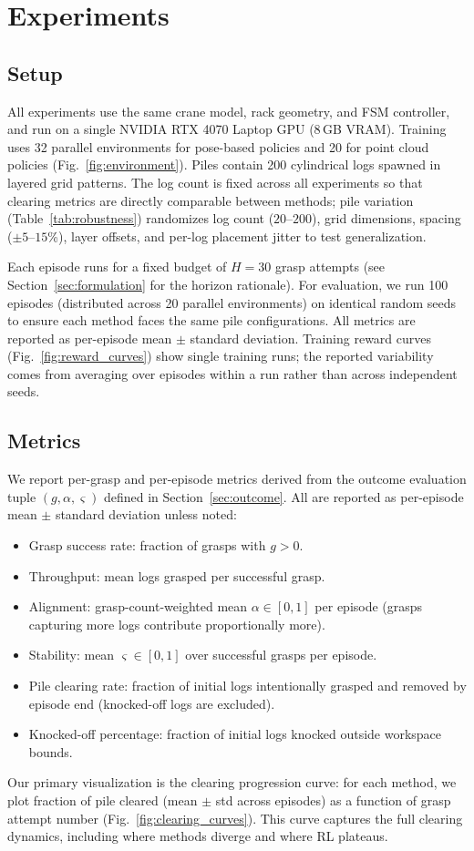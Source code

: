 \documentclass[conference]{IEEEtran}
\begin{document}
\section{Experiments}
\subsection{Setup}
All experiments use the same crane model, rack geometry, and FSM controller, and run on a single NVIDIA RTX 4070 Laptop GPU (8\,GB VRAM).
Training uses 32 parallel environments for pose-based policies and 20 for point cloud policies (Fig.~\ref{fig:environment}).
Piles contain 200 cylindrical logs spawned in layered grid patterns.
The log count is fixed across all experiments so that clearing metrics are directly comparable between methods; pile variation (Table~\ref{tab:robustness}) randomizes log count ($20$--$200$), grid dimensions, spacing ($\pm 5$--$15$\%), layer offsets, and per-log placement jitter to test generalization.

Each episode runs for a fixed budget of $H=30$ grasp attempts (see Section~\ref{sec:formulation} for the horizon rationale).
For evaluation, we run 100 episodes (distributed across 20 parallel environments) on identical random seeds to ensure each method faces the same pile configurations.
All metrics are reported as per-episode mean $\pm$ standard deviation.
Training reward curves (Fig.~\ref{fig:reward_curves}) show single training runs; the reported variability comes from averaging over episodes within a run rather than across independent seeds.

\subsection{Metrics}
\label{sec:metrics}
We report per-grasp and per-episode metrics derived from the outcome evaluation tuple $(g, \alpha, \varsigma)$ defined in Section~\ref{sec:outcome}. All are reported as per-episode mean $\pm$ standard deviation unless noted:
\begin{itemize}
    \item Grasp success rate: fraction of grasps with $g>0$.
    \item Throughput: mean logs grasped per successful grasp.
    \item Alignment: grasp-count-weighted mean $\alpha \in [0,1]$ per episode (grasps capturing more logs contribute proportionally more).
    \item Stability: mean $\varsigma \in [0,1]$ over successful grasps per episode.
    \item Pile clearing rate: fraction of initial logs intentionally grasped and removed by episode end (knocked-off logs are excluded).
    \item Knocked-off percentage: fraction of initial logs knocked outside workspace bounds.
\end{itemize}
Our primary visualization is the clearing progression curve: for each method, we plot fraction of pile cleared (mean $\pm$ std across episodes) as a function of grasp attempt number (Fig.~\ref{fig:clearing_curves}).
This curve captures the full clearing dynamics, including where methods diverge and where RL plateaus.
\end{document}
